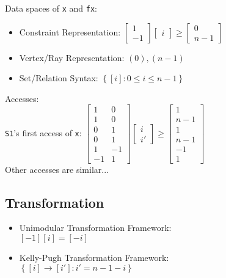 \documentclass[t,handout]{beamer}
\begin{document}
\begin{frame}
Data spaces of \texttt{x} and \texttt{fx}:
\bigskip{}
\begin{itemize}
\item Constraint Representation:
$\left[\begin{array}{c}
1\\
-1\end{array}\right]\left[\begin{array}{c}
i\end{array}\right]\ge\left[\begin{array}{c}
0\\
n-1\end{array}\right]$
\bigskip{}
\item Vertex/Ray Representation: $(0),(n-1)$
\bigskip{}
\item Set/Relation Syntax: $\left\{ \left[i\right]:0\le i\le n-1\right\} $
\end{itemize}
\end{frame}

\begin{frame}
Accesses: \\
\bigskip{}
\texttt{S1}'s first access of \texttt{x}:
\bigskip{}
$\left[\begin{array}{cc}
1 & 0\\
1 & 0\\
0 & 1\\
0 & 1\\
1 & -1\\
-1 & 1\end{array}\right]\left[\begin{array}{c}
i\\
i'\end{array}\right]\ge\left[\begin{array}{c}
1\\
n-1\\
1\\
n-1\\
-1\\
1\end{array}\right]$ \\
\bigskip{}
Other accesses are similar...
\end{frame}

\subsection{Transformation}
\begin{frame}
\begin{itemize}
\item Unimodular Transformation Framework: \\
\bigskip{}
$\left[-1\right]\left[i\right]=\left[-i\right]$
\bigskip{}
\item Kelly-Pugh Transformation Framework: \\
\bigskip{}
$\left\{ \left[i\right]\rightarrow\left[i'\right]:i'=n-1-i\right\}$
\end{itemize}

\end{frame}
\end{document}
